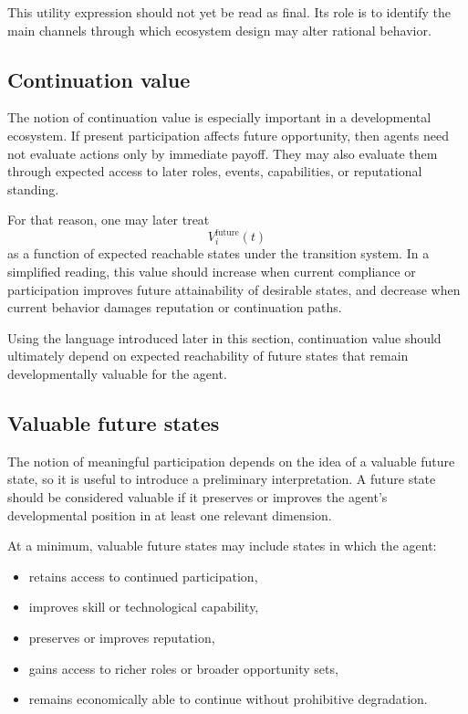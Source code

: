 \documentclass[11pt]{article}
\begin{document}
This utility expression should not yet be read as final. Its role is to identify the main channels through which ecosystem design may alter rational behavior.

\subsection{Continuation value}

The notion of continuation value is especially important in a developmental ecosystem. If present participation affects future opportunity, then agents need not evaluate actions only by immediate payoff. They may also evaluate them through expected access to later roles, events, capabilities, or reputational standing.

For that reason, one may later treat
\[
V_i^{\mathrm{future}}(t)
\]
as a function of expected reachable states under the transition system. In a simplified reading, this value should increase when current compliance or participation improves future attainability of desirable states, and decrease when current behavior damages reputation or continuation paths.

Using the language introduced later in this section, continuation value should ultimately depend on expected reachability of future states that remain developmentally valuable for the agent.

\subsection{Valuable future states}

The notion of meaningful participation depends on the idea of a valuable future state, so it is useful to introduce a preliminary interpretation. A future state should be considered valuable if it preserves or improves the agent's developmental position in at least one relevant dimension.

At a minimum, valuable future states may include states in which the agent:
\begin{itemize}
  \item retains access to continued participation,
  \item improves skill or technological capability,
  \item preserves or improves reputation,
  \item gains access to richer roles or broader opportunity sets,
  \item remains economically able to continue without prohibitive degradation.
\end{itemize}
\end{document}
